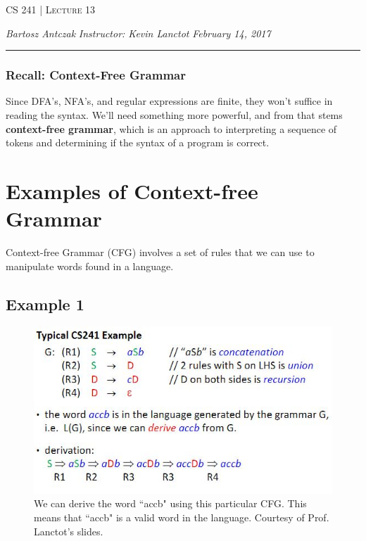 \documentclass{report}
\newcommand{\lectureNum}{13}
\newcommand{\curDate}{February 14, 2017}
\newcommand{\course}{CS 241}
\newcommand{\instructor}{Kevin Lanctot}
\begin{document}
\begin{center}
\begin{Large}
\textsc{\course{} | Lecture \lectureNum{}}
\end{Large}
\end{center} 
\noindent \textit{Bartosz Antczak} \hfill
\textit{Instructor: \instructor{}} \hfill
\textit{\curDate{}}
\rule{\textwidth}{0.4pt}
\subsubsection{Recall: Context-Free Grammar}
Since DFA's, NFA's, and regular expressions are finite, they won't suffice in reading the syntax. We'll need something more powerful, and from that stems \textbf{context-free grammar}, which is an approach to interpreting a sequence of tokens and determining if the syntax of a program is correct.
\section{Examples of Context-free Grammar}
Context-free Grammar (CFG) involves a set of rules that we can use to manipulate words found in a language.

\subsection{Example 1}
\begin{figure}[ht]
\begin{center}
\includegraphics[scale=0.8]{cfg1.jpg}
\end{center}
\caption{We can derive the word ``accb" using this particular CFG. This means that ``accb" is a valid word in the language. Courtesy of Prof. Lanctot's slides.} 
\end{figure}
\end{document}
